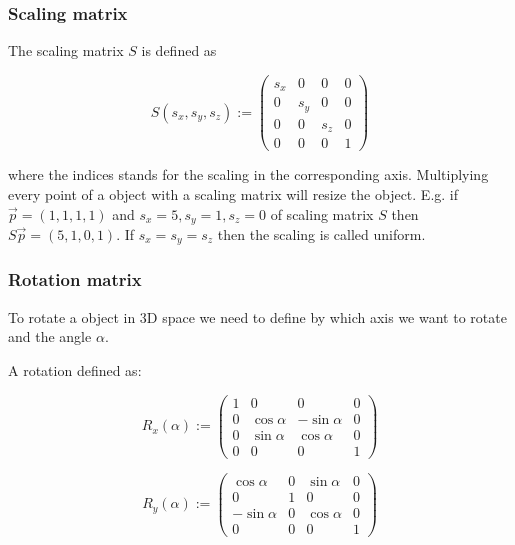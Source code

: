 \subsubsection{Scaling matrix}\label{scaling-matrix}

The scaling matrix $S$ is defined as

\[
  S(s_x,s_y,s_z):= \left(
          \begin{array}{cccc}
              s_x & 0   & 0   & 0 \\
              0   & s_y & 0   & 0 \\
              0   & 0   & s_z & 0 \\
              0   & 0   &  0  & 1
           \end{array}
       \right)
\]

where the indices stands for the scaling in the corresponding axis.
Multiplying every point of a object with a scaling matrix will resize
the object. E.g. if $\vec{p} = (1, 1, 1, 1)$ and
$s_x = 5, s_y = 1, s_z = 0$ of scaling matrix $S$ then
$S\vec{p} = (5, 1, 0, 1)$. If $s_x = s_y = s_z$ then the scaling is
called uniform.

\subsubsection{Rotation matrix}\label{rotation-matrix}

To rotate a object in 3D space we need to define by which axis we want
to rotate and the angle $\alpha$.

A rotation defined as:

\[
  R_x(\alpha) := \left(
          \begin{array}{cccc}
              1   & 0          & 0           & 0 \\
              0   & \cos \alpha & -\sin \alpha & 0 \\
              0   & \sin \alpha & \cos \alpha  & 0 \\
              0   & 0          & 0           & 1
           \end{array}
       \right)
\]

\[
  R_y(\alpha) := \left(
          \begin{array}{cccc}
              \cos \alpha  & 0 & \sin \alpha & 0\\
              0           & 1 & 0          & 0 \\
              -\sin \alpha & 0 & \cos \alpha & 0 \\
              0           & 0 & 0          & 1
           \end{array}
       \right)
\]

